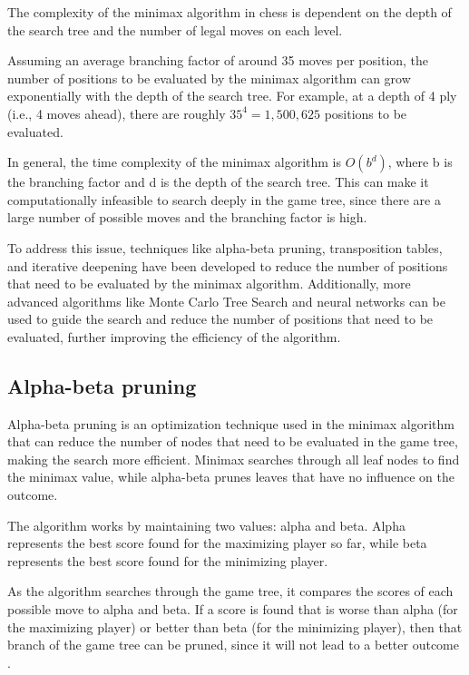 The complexity of the minimax algorithm in chess is dependent on the depth of the search tree and the number of legal moves on each level.

Assuming an average branching factor of around 35 moves per position, the number of positions to be evaluated by the minimax algorithm can grow exponentially with the depth of the search tree. For example, at a depth of 4 ply (i.e., 4 moves ahead), there are roughly $35^{4} = 1,500,625$ positions to be evaluated.

In general, the time complexity of the minimax algorithm is $O(b^{d})$, where b is the branching factor and d is the depth of the search tree. This can make it computationally infeasible to search deeply in the game tree, since there are a large number of possible moves and the branching factor is high.

To address this issue, techniques like alpha-beta pruning, transposition tables, and iterative deepening have been developed to reduce the number of positions that need to be evaluated by the minimax algorithm. Additionally, more advanced algorithms like Monte Carlo Tree Search and neural networks can be used to guide the search and reduce the number of positions that need to be evaluated, further improving the efficiency of the algorithm.

\subsection{Alpha-beta pruning}
\label{subsec:ch2sec2subsec2}

Alpha-beta pruning is an optimization technique used in the minimax algorithm that can reduce the number of nodes that need to be evaluated in the game tree, making the search more efficient. Minimax searches through all leaf nodes to find the minimax value, while alpha-beta prunes leaves that have no influence on the outcome.

The algorithm works by maintaining two values: alpha and beta. Alpha represents the best score found for the maximizing player so far, while beta represents the best score found for the minimizing player.

As the algorithm searches through the game tree, it compares the scores of each possible move to alpha and beta. If a score is found that is worse than alpha (for the maximizing player) or better than beta (for the minimizing player), then that branch of the game tree can be pruned, since it will not lead to a better outcome \cite{carolus2006alpha}.

